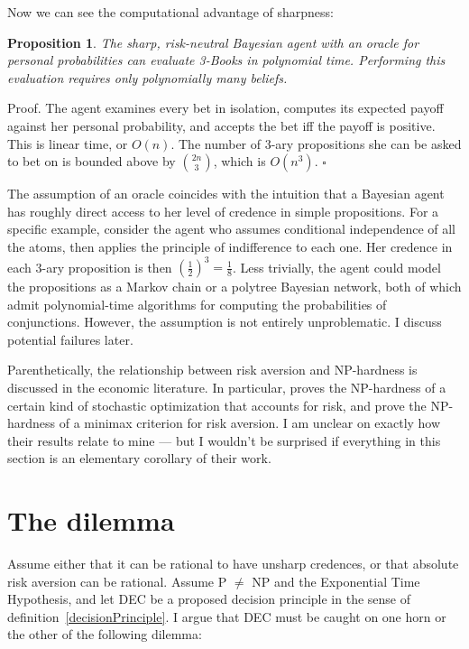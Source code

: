 \documentclass[letterpaper,12pt]{article}
\newtheorem{proposition}{Proposition}
\begin{document}
Now we can see the computational advantage of sharpness:

\begin{proposition}
\label{sharpEUMP}
The sharp, risk-neutral Bayesian agent with an oracle for personal probabilities can evaluate 3-Books in polynomial time. Performing this evaluation requires only polynomially many beliefs.
\end{proposition}

Proof. The agent examines every bet in isolation, computes its expected payoff against her personal probability, and accepts the bet iff the payoff is positive. This is linear time, or $O(n)$. The number of 3-ary propositions she can be asked to bet on is bounded above by $\binom{2n}{3}$, which is $O(n^3)$. $\square$

The assumption of an oracle coincides with the intuition that a Bayesian agent has roughly direct access to her level of credence in simple propositions. For a specific example, consider the agent who assumes conditional independence of all the atoms, then applies the principle of indifference to each one. Her credence in each 3-ary proposition is then $(\frac{1}{2})^3 = \frac{1}{8}$. Less trivially, the agent could model the propositions as a Markov chain or a polytree Bayesian network, both of which  admit polynomial-time algorithms for computing the probabilities of conjunctions. However, the assumption is not entirely unproblematic. I discuss potential failures later.

Parenthetically, the relationship between risk aversion and NP-hardness is discussed in the economic literature. In particular, \cite{DBLP:journals/mp/Ahmed06} proves the NP-hardness of a certain kind of stochastic optimization that accounts for risk, and \cite{DBLP:journals/mor/BertsimasDNT10} prove the NP-hardness of a minimax criterion for risk aversion. I am unclear on exactly how their results relate to mine --- but I wouldn't be surprised if everything in this section is an elementary corollary of their work.

\section{The dilemma}
Assume either that it can be rational to have unsharp credences, or that absolute risk aversion can be rational. Assume P $\not =$ NP and the Exponential Time Hypothesis, and let DEC be a proposed decision principle in the sense of definition~\ref{decisionPrinciple}. I argue that DEC must be caught on one horn or the other of the following dilemma:
\end{document}
